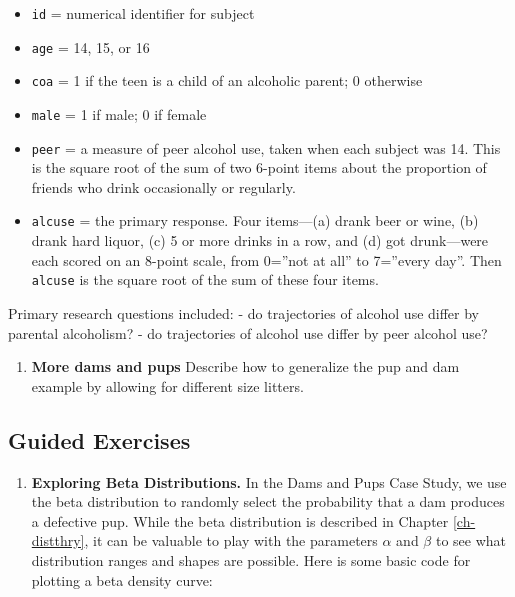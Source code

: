 \documentclass[
]{krantz}
\providecommand{\tightlist}{%
  \setlength{\itemsep}{0pt}\setlength{\parskip}{0pt}}
\begin{document}
\begin{enumerate}
  \begin{itemize}
  \tightlist
  \item
    \texttt{id} = numerical identifier for subject
  \item
    \texttt{age} = 14, 15, or 16
  \item
    \texttt{coa} = 1 if the teen is a child of an alcoholic parent; 0 otherwise
  \item
    \texttt{male} = 1 if male; 0 if female
  \item
    \texttt{peer} = a measure of peer alcohol use, taken when each subject was 14. This is the square root of the sum of two 6-point items about the proportion of friends who drink occasionally or regularly.
  \item
    \texttt{alcuse} = the primary response. Four items---(a) drank beer or wine, (b) drank hard liquor, (c) 5 or more drinks in a row, and (d) got drunk---were each scored on an 8-point scale, from 0=''not at all'' to 7=''every day''. Then \texttt{alcuse} is the square root of the sum of these four items.
  \end{itemize}
\end{enumerate}

Primary research questions included:
- do trajectories of alcohol use differ by parental alcoholism?
- do trajectories of alcohol use differ by peer alcohol use?

\begin{enumerate}
\def\labelenumi{\arabic{enumi}.}
\setcounter{enumi}{1}
\tightlist
\item
  \textbf{More dams and pups} Describe how to generalize the pup and dam example by allowing for different size litters.
\end{enumerate}

\hypertarget{guided-exercises}{%
\subsection{Guided Exercises}\label{guided-exercises}}

\begin{enumerate}
\def\labelenumi{\arabic{enumi}.}
\tightlist
\item
  \textbf{Exploring Beta Distributions.} In the Dams and Pups Case Study, we use the beta distribution to randomly select the probability that a dam produces a defective pup. While the beta distribution is described in Chapter \ref{ch-distthry}, it can be valuable to play with the parameters \(\alpha\) and \(\beta\) to see what distribution ranges and shapes are possible. Here is some basic code for plotting a beta density curve:
\end{enumerate}
\end{document}
